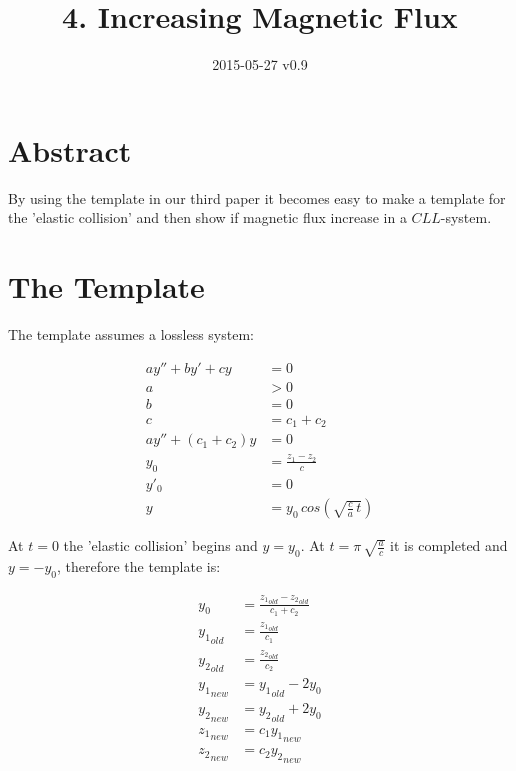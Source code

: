 \documentclass[]{../common/elementary-physics}
\title{4. Increasing Magnetic Flux}
\date{2015-05-27 v0.9}
\begin{document}
\maketitle

\tableofcontents

\section{Abstract}

By using the template in our third paper\cite{ef3ch} it becomes easy to make a template for the 'elastic collision' and then show if magnetic flux increase in a $CLL$-system.

\section{The Template}

The template assumes a lossless system:

\begin{subequations}
\begin{align}
a y'' + b y' + c y &= 0 \\
a &> 0 \\
b &= 0 \\
c &= c_1 + c_2 \\
a y'' + (c_1 + c_2) y &= 0 \\
y_0 &= \frac{z_1-z_2}{c} \\
y'_0 &= 0 \\
y &= y_0 \, cos(\sqrt{\frac{c}{a} \, t})
\end{align}
\end{subequations}

At $t=0$ the 'elastic collision' begins and $y=y_0$.
At $t = \pi \, \sqrt{\frac{a}{c}}$ it is completed and $y = -y_0$, therefore the template is:

\begin{subequations}
\begin{align}
y_0 &= \frac{{z_1}_{old}-{z_2}_{old}}{c_1 + c_2} \\
{y_1}_{old} &= \frac{{z_1}_{old}}{c_1} \\
{y_2}_{old} &= \frac{{z_2}_{old}}{c_2} \\
{y_1}_{new} &= {y_1}_{old} -2 y_0 \\
{y_2}_{new} &= {y_2}_{old} +2 y_0 \\
{z_1}_{new} &= c_1 {y_1}_{new} \\
{z_2}_{new} &= c_2 {y_2}_{new}
\end{align}
\end{subequations}
\end{document}
